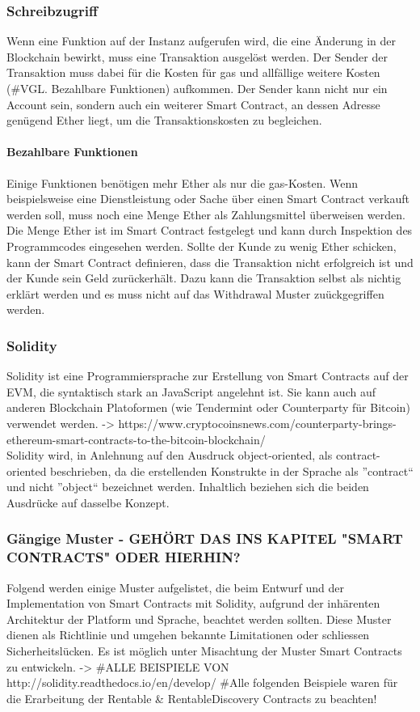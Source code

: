 \subsubsection{Schreibzugriff}
Wenn eine Funktion auf der Instanz aufgerufen wird, die eine Änderung in der Blockchain bewirkt, muss eine Transaktion ausgelöst werden. Der Sender der Transaktion muss dabei für die Kosten für gas und allfällige weitere Kosten (\#VGL. Bezahlbare Funktionen) aufkommen. Der Sender kann nicht nur ein Account sein, sondern auch ein weiterer Smart Contract, an dessen Adresse genügend Ether liegt, um die Transaktionskosten zu begleichen.

\paragraph{Bezahlbare Funktionen}
Einige Funktionen benötigen mehr Ether als nur die gas-Kosten. Wenn beispielsweise eine Dienstleistung oder Sache über einen Smart Contract verkauft werden soll, muss noch eine Menge Ether als Zahlungsmittel überweisen werden. Die Menge Ether ist im Smart Contract festgelegt und kann durch Inspektion des Programmcodes eingesehen werden. Sollte der Kunde zu wenig Ether schicken, kann der Smart Contract definieren, dass die Transaktion nicht erfolgreich ist und der Kunde sein Geld zurückerhält. Dazu kann die Transaktion selbst als nichtig erklärt werden und es muss nicht auf das Withdrawal Muster zuückgegriffen werden.

\subsubsection{Solidity}
Solidity ist eine Programmiersprache zur Erstellung von Smart Contracts auf der \acrfull{EVM}, die syntaktisch stark an JavaScript angelehnt ist. Sie kann auch auf anderen Blockchain Platoformen (wie Tendermint oder Counterparty für Bitcoin) verwendet werden. -> https://www.cryptocoinsnews.com/counterparty-brings-ethereum-smart-contracts-to-the-bitcoin-blockchain/\\Solidity wird, in Anlehnung auf den Ausdruck object-oriented, als contract-oriented beschrieben, da die erstellenden Konstrukte in der Sprache als ''contract`` und nicht ''object`` bezeichnet werden. Inhaltlich beziehen sich die beiden Ausdrücke auf dasselbe Konzept.

\subsubsection{Gängige Muster - GEHÖRT DAS INS KAPITEL "SMART CONTRACTS" ODER HIERHIN?}
Folgend werden einige Muster aufgelistet, die beim Entwurf und der Implementation von Smart Contracts mit Solidity, aufgrund der inhärenten Architektur der Platform und Sprache, beachtet werden sollten. Diese Muster dienen als Richtlinie und umgehen bekannte Limitationen oder schliessen Sicherheitslücken. Es ist möglich unter Misachtung der Muster Smart Contracts zu entwickeln. -> \#ALLE BEISPIELE VON http://solidity.readthedocs.io/en/develop/
\#Alle folgenden Beispiele waren für die Erarbeitung der Rentable \& RentableDiscovery Contracts zu beachten!

